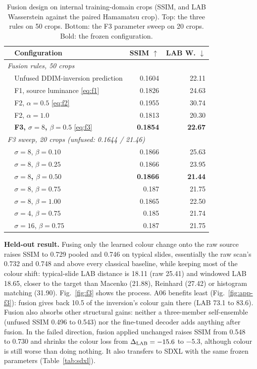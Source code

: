 \begin{table}[t]
\centering
\caption{Fusion design on internal training-domain crops (SSIM, and LAB Wasserstein against the paired
Hamamatsu crop). Top: the three rules on 50 crops. Bottom: the F3 parameter sweep on 20 crops. Bold: the
frozen configuration.}
\label{tab:fusion}
\footnotesize
\begin{tabular}{llrr}
\toprule
& Configuration & SSIM $\uparrow$ & LAB W. $\downarrow$\\
\midrule
\multicolumn{4}{l}{\emph{Fusion rules, 50 crops}}\\
& Unfused DDIM-inversion prediction & 0.1604 & 22.11\\
& F1, source luminance \eqref{eq:f1} & 0.1826 & 24.63\\
& F2, $\alpha=0.5$ \eqref{eq:f2} & 0.1955 & 30.74\\
& F2, $\alpha=1.0$ & 0.1813 & 20.30\\
& \textbf{F3, $\sigma=8$, $\beta=0.5$} \eqref{eq:f3} & \textbf{0.1854} & \textbf{22.67}\\
\midrule
\multicolumn{4}{l}{\emph{F3 sweep, 20 crops (unfused: 0.1644 / 21.46)}}\\
& $\sigma=8$, $\beta=0.10$ & 0.1866 & 25.63\\
& $\sigma=8$, $\beta=0.25$ & 0.1866 & 23.95\\
& \textbf{$\sigma=8$, $\beta=0.50$} & \textbf{0.1866} & \textbf{21.44}\\
& $\sigma=8$, $\beta=0.75$ & 0.187 & 21.75\\
& $\sigma=8$, $\beta=1.00$ & 0.1865 & 22.50\\
& $\sigma=4$, $\beta=0.75$ & 0.185 & 21.74\\
& $\sigma=16$, $\beta=0.75$ & 0.187 & 21.75\\
\bottomrule
\end{tabular}
\end{table}

\textbf{Held-out result.} Fusing only the learned colour change onto the raw source raises SSIM to 0.729 pooled
and 0.746 on typical slides, essentially the raw scan's 0.732 and 0.748 and above every classical baseline, while keeping most of the colour shift:
typical-slide LAB distance is 18.11 (raw 25.41) and windowed LAB 18.65, closer to the target than Macenko
(21.88), Reinhard (27.42) or histogram matching (31.90). Fig.~\ref{fig:f3} shows the process. A06 benefits
least (Fig.~\ref{fig:app-f3}): fusion gives back 10.5 of the inversion's colour gain there (LAB 73.1 to 83.6). Fusion also absorbs other structural
gains: neither a three-member self-ensemble (unfused SSIM 0.496 to 0.543) nor the fine-tuned decoder adds
anything after fusion. In the failed \HtoA{} direction, fusion applied unchanged raises SSIM from
0.548 to 0.730 and shrinks the colour loss from $\Delta_{\mathrm{LAB}}=-15.6$ to $-5.3$, although colour is still worse
than doing nothing. It also transfers to SDXL with the same frozen parameters (Table~\ref{tab:sdxl}).

